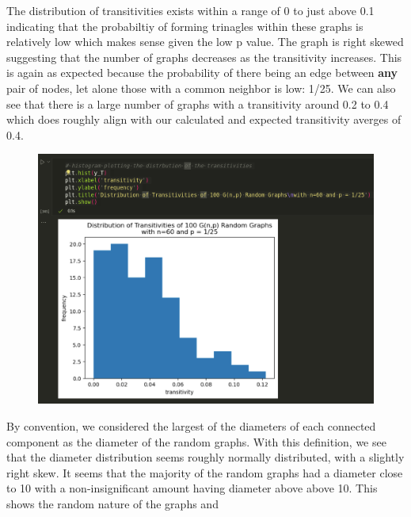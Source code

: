 \documentclass{article}
\begin{document}
\begin{enumerate}[label=(\alph*), left=10pt, itemsep=10pt]
\begin{minipage}[t]{0.9\textwidth}
\begin{figure}[H]
            \end{figure}
        \end{minipage}
        \newpage
        \begin{minipage}[t]{0.9\textwidth}
            The distribution of transitivities exists within a range of 0 to just above 0.1 indicating that the probabiltiy
            of forming trinagles within these graphs is relatively low which makes sense given the low p value. The graph is
            right skewed suggesting that the number of graphs decreases as the transitivity increases. This is again as expected
            because the probability of there being an edge between \textbf{any} pair of nodes, let alone those with a common neighbor
            is low: 1/25. We can also see that there is a large number of graphs with a transitivity around 0.2 to 0.4 which
            does roughly align with our calculated and expected transitivity averges of 0.4. 
            \begin{figure}[H]
                \centering
                \includegraphics[width=1\textwidth, height=0.35\textheight]{./3biii.png}
            \end{figure}
            By convention, we considered the largest of the diameters of each connected component as the diameter of
            the random graphs. With this definition, we see that the diameter distribution seems roughly normally distributed,
            with a slightly right skew. It seems that the majority of the random graphs had a diameter close to 10 with a
            non-insignificant amount having diameter above above 10. This shows the random nature of the graphs and

\end{minipage}
\end{enumerate}
\end{document}
